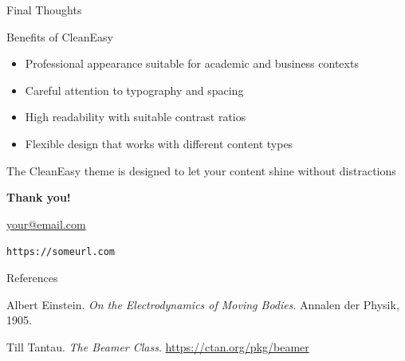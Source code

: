 \documentclass[aspectratio=169,xcolor=dvipsnames]{beamer}
\begin{document}
\begin{frame}{Final Thoughts}
  \begin{block}{Benefits of CleanEasy}
    \begin{itemize}
      \item Professional appearance suitable for academic and business contexts
      \item Careful attention to typography and spacing
      \item High readability with suitable contrast ratios
      \item Flexible design that works with different content types
    \end{itemize}
  \end{block}
  
  \vspace{0.5cm}
  
  \begin{center}
    \large{The CleanEasy theme is designed to let your content shine without distractions}
  \end{center}
\end{frame}

\begin{frame}[plain]
  \centering
  \Huge \textbf{Thank you!}
  
  \vspace{1cm}
  \normalsize
  \href{mailto:your@email.com}{your@email.com}
  
  \vspace{0.5cm}
  \small
  \texttt{https://someurl.com}
\end{frame}

\begin{frame}{References}
  \begin{thebibliography}{9}
      Albert Einstein.
      \emph{On the Electrodynamics of Moving Bodies}.
      Annalen der Physik, 1905.
    
      Till Tantau.
      \emph{The Beamer Class}.
      \url{https://ctan.org/pkg/beamer}
  \end{thebibliography}
\end{frame}

%   
%   
\end{document}
